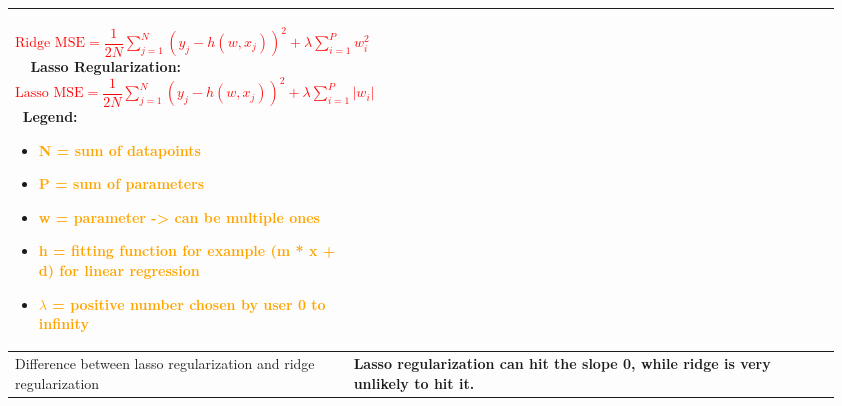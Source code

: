 \documentclass[main.tex,fontsize=8pt,paper=a4,paper=portrait,DIV=calc,]{scrartcl}
\begin{document}
\begin{table}[ht!]
\begin{tabular}{|m{0.2\linewidth}|m{0.755\linewidth}|}
\huge \textcolor{red}{\( \text{Ridge MSE} = \dfrac{1}{2N}\sum^{N}_{j=1}(y_j - h(w,x_j))^2 + \lambda \sum^{P}_{i=1} w_i^2 \)}\newline
\normalsize \, \newline 
\, \newline
\textcolor{OliveGreen}{Lasso Regularization:}\newline
\huge \textcolor{red}{\( \text{Lasso MSE} = \dfrac{1}{2N}\sum^{N}_{j=1}(y_j - h(w,x_j))^2 + \lambda \sum^{P}_{i=1} |w_i| \)}\newline
\normalsize \, \newline  
Legend: \newline
\begin{itemize}
\item \textcolor{Orange}{N = sum of datapoints}
\item \textcolor{Orange}{P = sum of parameters}
\item \textcolor{Orange}{w = parameter -> can be multiple ones}
\item \textcolor{Orange}{h = fitting function for example (m * x + d) for linear regression}
\item \textcolor{Orange}{\( \lambda \) = positive number chosen by user 0 to infinity}
\vspace{-3mm}
\end{itemize}\\
\hline
Difference between lasso regularization and ridge regularization & 
\textbf{Lasso regularization can hit the slope 0, while ridge is very unlikely to hit it.}\\
\hline

\hline

\hline

\hline

\hline
\end{tabular}
\end{table}
\end{document}
